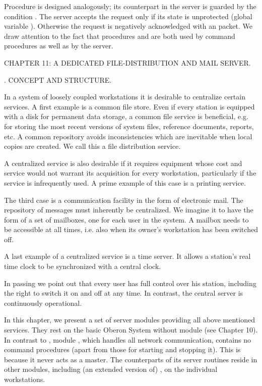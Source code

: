 Procedure  is designed analogously; its counterpart in the server is guarded by the condition  \equiv {}. The server accepts the request only if its state is unprotected (global variable ). Otherwise the request is negatively acknowledged with an  packet. We draw attention to the fact that procedures  and  are both used by command procedures as well as by the server.

\beginchapter CHAPTER 11: A DEDICATED FILE-DISTRIBUTION AND MAIL SERVER.

. CONCEPT AND STRUCTURE.

In a system of loosely coupled workstations it is desirable to centralize certain services. A first example is a common file store. Even if every station is equipped with a disk for permanent data storage, a common file service is beneficial, e.g. for storing the most recent versions of system files, reference documents, reports, etc. A common repository avoids inconsistencies which are inevitable when local copies are created. We call this a file distribution service.

A centralized service is also desirable if it requires equipment whose cost and service would not warrant its acquisition for every workstation, particularly if the service is infrequently used. A prime example of this case is a printing service.

The third case is a communication facility in the form of electronic mail. The repository of messages must inherently be centralized. We imagine it to have the form of a set of mailboxes, one for each user in the system. A mailbox needs to be accessible at all times, i.e. also when its owner's workstation has been switched off.

A last example of a centralized service is a time server. It allows a station's real time clock to be synchronized with a central clock.

In passing we point out that every user has full control over his station, including the right to switch it on and off at any time. In contrast, the central server is continuously operational.

In this chapter, we present a set of server modules providing all above mentioned services. They rest on the basic Oberon System without module  (see Chapter 10). In contrast to , module , which handles all network communication, contains no command procedures (apart from those for starting and stopping it). This is because it never acts as a master. The counterparts of its server routines reside in other modules, including (an extended version of) , on the individual workstations.

